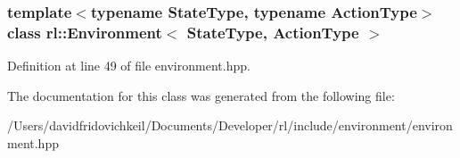 \subsubsection*{template$<$typename State\+Type, typename Action\+Type$>$\newline
class rl\+::\+Environment$<$ State\+Type, Action\+Type $>$}



Definition at line 49 of file environment.\+hpp.



The documentation for this class was generated from the following file\+:\begin{DoxyCompactItemize}
\item 
/\+Users/davidfridovichkeil/\+Documents/\+Developer/rl/include/environment/environment.\+hpp\end{DoxyCompactItemize}
